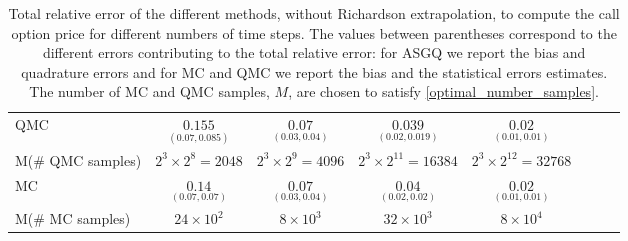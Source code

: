 \begin{table}[h!]
\begin{small}
\begin{tabular}{l*{6}{c}r}
			\hline
			QMC     & $\underset{(0.07,0.085)}{\mathbf{0.155}}$  & $\underset{(0.03,0.04)}{\mathbf{0.07}}$  & $\underset{(0.02,0.019)}{\mathbf{0.039}}$ & $\underset{(0.01,0.01)}{\mathbf{0.02}}$  \\		
			M(\# QMC samples)   & $2^3 \times 2^8=2048$  &  $2^3 \times 2^9=4096$  &  $2^3 \times 2^{11}=16384$ &  $2^3 \times 2^{12}=32768$ \\
%			
			\hline
			MC    & $\underset{(0.07,0.07)}{\mathbf{0.14}}$  & $\underset{(0.03,0.04)}{\mathbf{0.07}}$  & $\underset{(0.02,0.02)}{\mathbf{0.04}}$ & $\underset{(0.01,0.01)}{\mathbf{0.02}}$  \\		
			M(\# MC samples)   & $24 \times 10^2$  & $8 \times 10^3$  & $32 \times 10^3$ & $8 \times 10^4$  \\		
			\bottomrule[1.25pt]
		\end{tabular}
		\caption{Total relative error of the different methods, without Richardson extrapolation, to compute the call option price  for different numbers of time steps. The values between parentheses correspond to the different errors contributing to the total relative error: for ASGQ we report the bias and quadrature errors and for MC and QMC we report the bias and the statistical errors estimates. The number of MC and QMC samples, $M$, are chosen to satisfy \eqref{optimal_number_samples}.}
		\label{Total error of MISC and MC to compute Call option price of the different tolerances for different number of time steps. Case set 5, without Richardson extrapolation. The numbers between parentheses are the corresponding absolute errors.}
	\end{small}
\end{table}

